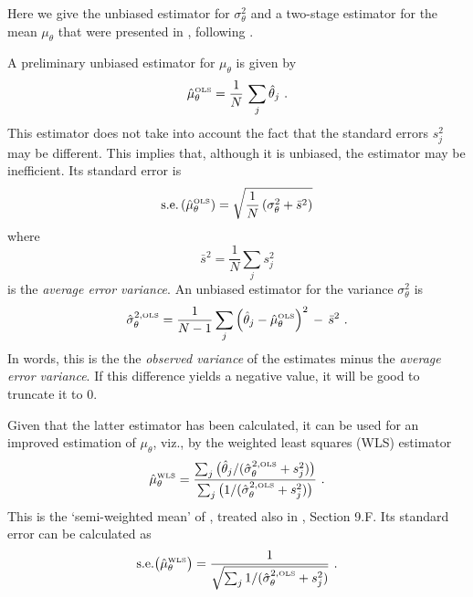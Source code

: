 \documentclass[a4paper,12pt,fleqn]{article}
\begin{document}
Here we give the unbiased estimator for $\sigma^2_\theta$ and
a two-stage estimator for the mean $\mu_\theta$ that were presented
in \citet{SnijdersBaerveldt03}, following \citet{Cochran54}.

A preliminary unbiased estimator for $\mu_\theta$ is given by
\begin{equation}
{\hat{\mu}}_\theta^{\mbox{\tiny OLS}} = \frac{1}{N}\, \sum_j {\hat{\theta}}_j \ .
         \label{muols}
\end{equation}
This estimator does not take into account the fact that the standard errors
$s_j^2$ may be different.
This implies that, although it is unbiased, the estimator may be inefficient.
Its standard error is
\begin{equation}
 \mbox{s.e.}\left( {\hat{\mu}}_\theta^{\mbox{\tiny OLS}} \right) =
    \sqrt{\frac{1}{N} \left( \sigma^2_\theta + {\bar{s}}^2 \right) }
\end{equation}
where
\begin{equation}
{\bar{s}}^2 =  \frac{1}{N} \sum_j s^2_j
\end{equation}
is the \emph{average error variance}.
An unbiased estimator for the variance $\sigma^2_\theta$ is
\begin{equation}
 {\hat{\sigma}}^{2, \mbox{\tiny OLS}}_\theta =
   \frac{1}{N-1} \sum_j \left( {\hat{\theta}}_j -
                         {\hat{\mu}}^{\mbox{\tiny OLS}}_\theta \right)^2
               \, - \, {\bar{s}}^2  \ .          \label{sigmahat}
\end{equation}
In words, this is the the \emph{observed variance} of the
estimates minus the \emph{average error variance}.
If this difference yields a negative value, it will be good to truncate it to 0.

Given that the latter estimator has been calculated, it can be used for an improved
estimation of $\mu_\theta$, viz., by the weighted least squares
(WLS) estimator
\begin{equation}
 {\hat{\mu}}_\theta^{\mbox{\tiny WLS}} =
       \frac{ \sum_j \big( {\hat{\theta}}_j / ({\hat{\sigma}}^{2, \mbox{\tiny OLS}}_\theta
                    + s^2_j ) \big) }
            { \sum_j \big( 1/({\hat{\sigma}}^{2, \mbox{\tiny OLS}}_\theta + s^2_j ) \big)} \ .
                                               \label{muwls}
\end{equation}
This is the `semi-weighted mean' of \citet{Cochran54},
treated also in \citet{HedgesOlkin85}, Section 9.F.
Its standard error can be calculated as
\begin{equation}
 \mbox{s.e.}\big( {\hat{\mu}}_\theta^{\mbox{\tiny WLS}} \big) =
     \frac {1}
     {\sqrt{ \sum_j 1/({\hat{\sigma}}^{2, \mbox{\tiny OLS}}_\theta + s^2_j ) } } \ .  \label{se1}
\end{equation}
\end{document}
